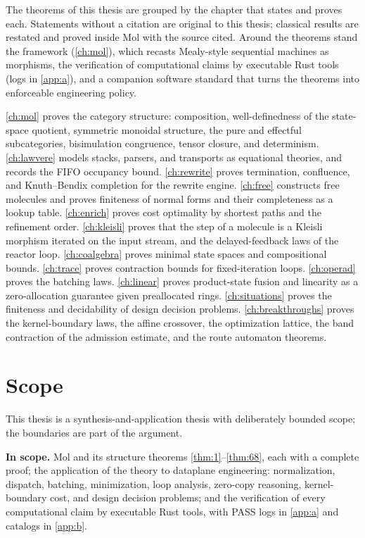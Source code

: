 The theorems of this thesis are grouped by the chapter that states and
proves each. Statements without a citation are original to this thesis;
classical results are restated and proved inside Mol with the source
cited. Around the theorems stand the framework (\autoref{ch:mol}),
which recasts Mealy-style sequential machines \citep{mealy,moore} as
morphisms, the verification of computational claims by executable Rust
tools (logs in \autoref{app:a}), and a companion software standard that
turns the theorems into enforceable engineering policy.

\autoref{ch:mol} proves the category structure: composition,
well-definedness of the state-space quotient, symmetric monoidal
structure, the pure and effectful subcategories, bisimulation
congruence, tensor closure, and determinism. \autoref{ch:lawvere}
models stacks, parsers, and transports as equational theories, and records the FIFO occupancy bound.
\autoref{ch:rewrite} proves termination, confluence, and Knuth--Bendix
completion for the rewrite engine. \autoref{ch:free} constructs free
molecules and proves finiteness of normal forms and their completeness
as a lookup table. \autoref{ch:enrich} proves cost optimality by
shortest paths and the refinement order. \autoref{ch:kleisli} proves
that the step of a molecule is a Kleisli morphism iterated on the input
stream, and the delayed-feedback laws of the reactor loop. \autoref{ch:coalgebra}
proves minimal state spaces and compositional bounds. \autoref{ch:trace}
proves contraction bounds for fixed-iteration loops. \autoref{ch:operad}
proves the batching laws. \autoref{ch:linear} proves product-state fusion and linearity as a
zero-allocation guarantee given preallocated rings.
\autoref{ch:situations} proves the finiteness and decidability of
design decision problems. \autoref{ch:breakthroughs} proves the
kernel-boundary laws, the affine crossover, the optimization lattice,
the band contraction of the admission estimate, and the route
automaton theorems.
\section{Scope}
\label{sec:scope}

This thesis is a synthesis-and-application thesis with deliberately bounded scope; the boundaries are part of the argument.

\textbf{In scope.} Mol and its structure theorems \autoref{thm:1}--\autoref{thm:68}, each with a complete proof; the application of the theory to dataplane engineering: normalization, dispatch, batching, minimization, loop analysis, zero-copy reasoning, kernel-boundary cost, and design decision problems; and the verification of every computational claim by executable Rust tools, with PASS logs in \autoref{app:a} and catalogs in \autoref{app:b}.

